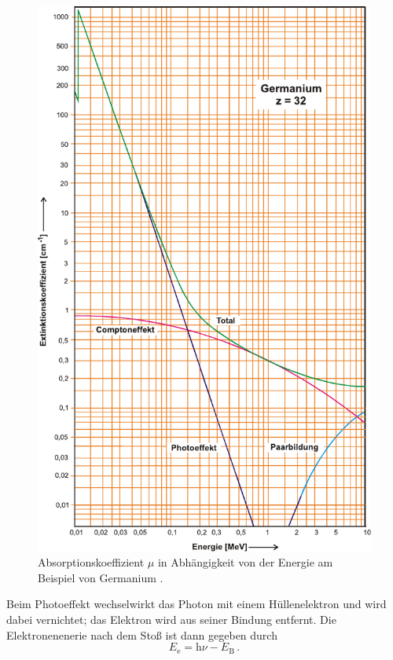 \begin{figure}[H]
    \centering
    \includegraphics{figures/abb4.pdf}
    \caption{Absorptionskoeffizient $\mu$ in Abhängigkeit von der Energie am Beispiel von Germanium \cite{ap04}.}
    \label{fig:abb4}
\end{figure}

Beim Photoeffekt wechselwirkt das Photon mit einem Hüllenelektron und
wird dabei vernichtet; das Elektron wird aus seiner Bindung entfernt.
Die Elektronenenerie nach dem Stoß ist dann gegeben durch
\begin{equation*}
    E_{\mathrm{e}} = \mathrm{h} \nu - E_{\mathrm{B}} \,.
\end{equation*} \\

